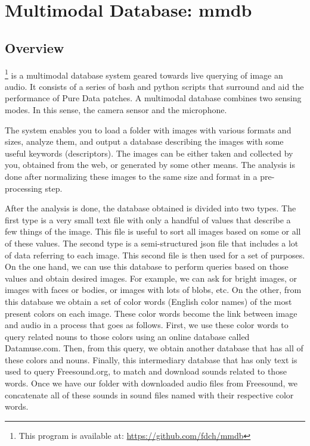 \chapter{Multimodal Database: mmdb}

\section{Overview}

\footnote{This program is available at: \url{https://github.com/fdch/mmdb}} is a multimodal database system geared towards live querying of image an audio. It consists of a series of bash and python scripts that surround and aid the performance of Pure Data patches. A multimodal database combines two sensing modes. In this sense, the camera sensor and the microphone.

The system enables you to load a folder with images with various formats and sizes, analyze them, and output a database describing the images with some useful keywords (descriptors). The images can be either taken and collected by you, obtained from the web, or generated by some other means. The analysis is done after normalizing these images to the same size and format in a pre-processing step.

After the analysis is done, the database obtained is divided into two types. The first type is a very small text file with only a handful of values that describe a few things of the image. This file is useful to sort all images based on some or all of these values. The second type is a semi-structured \gls{json} file that includes a lot of data referring to each image. This second file is then used for a set of purposes. On the one hand, we can use this database to perform queries based on those values and obtain desired images. For example, we can ask for bright images, or images with faces or bodies, or images with lots of blobs, etc. On the other, from this database we obtain a set of color words (English color names) of the most present colors on each image. These color words become the link between image and audio in a process that goes as follows. First, we use these color words to query related nouns to those colors using an online database called Datamuse.com. Then, from this query, we obtain another database that has all of these colors and nouns. Finally, this intermediary database that has only text is used to query Freesound.org, to match and download sounds related to those words. Once we have our folder with downloaded audio files from Freesound, we concatenate all of these sounds in sound files named with their respective color words.

